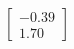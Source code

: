 \documentclass[preview]{standalone}
\begin{document}
\begin{align*}
\begin{bmatrix} -0.39 \\ 1.70 \end{bmatrix}
\end{align*}
\end{document}
